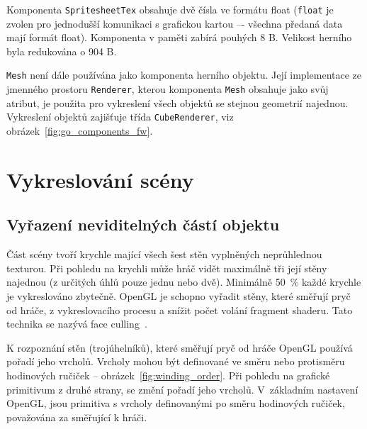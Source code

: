 \documentclass[thesis=M,czech]{FITthesis}[2019/12/23]
\begin{document}
Komponenta \texttt{SpritesheetTex} obsahuje dvě čísla ve formátu float (\texttt{float} je zvolen pro jednodušší komunikaci s grafickou kartou –- všechna předaná data mají formát float). Komponenta v paměti zabírá pouhých 8 B. Velikost herního byla redukována o 904 B.

\texttt{Mesh} není dále používána jako komponenta herního objektu. Její implementace ze jmenného prostoru \texttt{Renderer}, kterou komponenta \texttt{Mesh} obsahuje jako svůj atribut, je použita pro vykreslení všech objektů se stejnou geometrií najednou. Vykreslení objektů zajišťuje třída \texttt{CubeRenderer}, viz obrázek~\ref{fig:go_components_fw}.




\chapter{Vykreslování scény}


\section{Vyřazení neviditelných částí objektu}

Část scény tvoří krychle mající všech šest stěn vyplněných neprůhlednou texturou. Při pohledu na krychli může hráč vidět maximálně tři její stěny najednou (z určitých úhlů pouze jednu nebo dvě). Minimálně 50~\% každé krychle je vykreslováno zbytečně. OpenGL je schopno vyřadit stěny, které směřují pryč od hráče, z vykreslovacího procesu a snížit počet volání fragment shaderu. Tato technika se nazývá face culling~\cite{lopgl_faceculling}.

K rozpoznání stěn (trojúhelníků), které směřují pryč od hráče OpenGL používá pořadí jeho vrcholů. Vrcholy mohou být definované ve směru nebo protisměru hodinových ručiček  -- obrázek~\ref{fig:winding_order}. Při pohledu na grafické primitivum z druhé strany, se změní pořadí jeho vrcholů. V~základním nastavení OpenGL, jsou primitiva s vrcholy definovanými po směru hodinových ručiček, považována za směřující k hráči.
\end{document}

